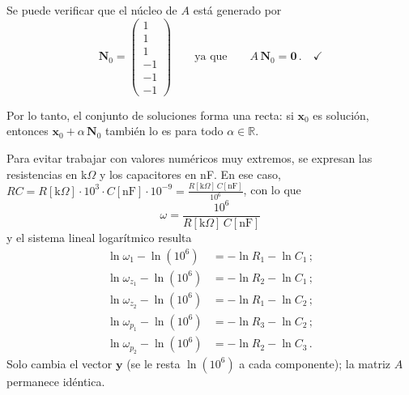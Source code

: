 Se puede verificar que el núcleo de $A$ está generado por
\[
    \mathbf{N}_0 = \begin{pmatrix} 1 \\ 1 \\ 1 \\ -1 \\ -1 \\ -1 \end{pmatrix}
    \qquad \text{ya que} \qquad A\,\mathbf{N}_0 = \mathbf{0} \,.\quad \checkmark
\]

Por lo tanto, el conjunto de soluciones forma una recta: si $\mathbf{x}_0$ es solución, entonces $\mathbf{x}_0 + \alpha\,\mathbf{N}_0$ también lo es para todo $\alpha \in \mathbb{R}$.

Para evitar trabajar con valores numéricos muy extremos, se expresan las resistencias en k$\Omega$ y los capacitores en nF. En ese caso, $RC = R[\text{k}\Omega] \cdot 10^3 \cdot C[\text{nF}] \cdot 10^{-9} = \frac{R[\text{k}\Omega]\,C[\text{nF}]}{10^6}$, con lo que
\[
    \omega = \frac{10^6}{R[\text{k}\Omega]\,C[\text{nF}]}
\]
y el sistema lineal logarítmico resulta
\begin{align*}
    \ln \omega_1    - \ln(10^6) &= -\ln R_1 - \ln C_1\,; \\
    \ln \omega_{z_1} - \ln(10^6) &= -\ln R_2 - \ln C_1\,; \\
    \ln \omega_{z_2} - \ln(10^6) &= -\ln R_1 - \ln C_2\,; \\
    \ln \omega_{p_1} - \ln(10^6) &= -\ln R_3 - \ln C_2\,; \\
    \ln \omega_{p_2} - \ln(10^6) &= -\ln R_2 - \ln C_3\,.
\end{align*}
Solo cambia el vector $\mathbf{y}$ (se le resta $\ln(10^6)$ a cada componente); la matriz $A$ permanece idéntica.

